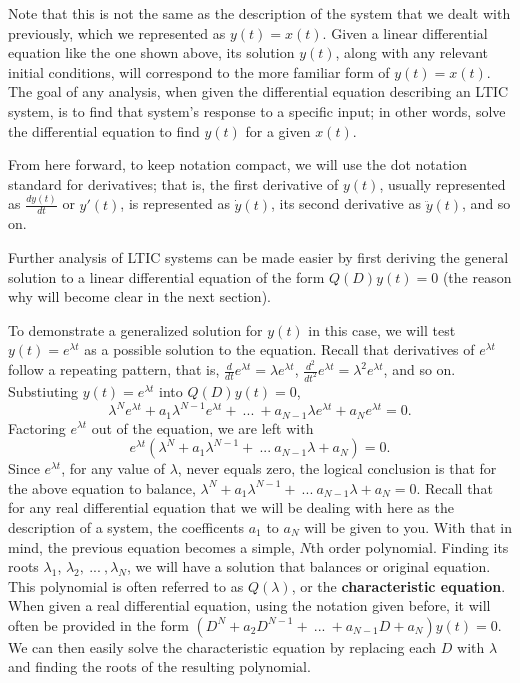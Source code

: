 \documentclass{article}
\begin{document}
Note that this is not the same as the description of the system that we dealt with previously, which we represented as \(y(t) = x(t)\). Given a linear differential equation like the one shown above, its solution \(y(t)\), along with any relevant initial conditions, will correspond to the more familiar form of \(y(t) = x(t).\) The goal of any analysis, when given the differential equation describing an LTIC system, is to find that system's response to a specific input; in other words, solve the differential equation to find \(y(t)\) for a given \(x(t)\).

From here forward, to keep notation compact, we will use the dot notation standard for derivatives; that is, the first derivative of \(y(t)\), usually represented as \(\frac{dy(t)}{dt}\) or \(y'(t)\), is represented as \(\dot{y}(t)\), its second derivative as \(\ddot{y}(t)\), and so on.

Further analysis of LTIC systems can be made easier by first deriving the general solution to a linear differential equation of the form \(Q(D)y(t) = 0\) (the reason why will become clear in the next section). 

To demonstrate a generalized solution for \(y(t)\) in this case, we will test \(y(t) = e^{\lambda t}\) as a possible solution to the equation. Recall that derivatives of \(e^{\lambda t}\) follow a repeating pattern, that is, \(\frac{d}{dt}e^{\lambda t} = \lambda e^{\lambda t}\), \(\frac{d^2}{dt^2}e^{\lambda t} = \lambda^2 e^{\lambda t}\), and so on. Substiuting \(y(t) = e^{\lambda t}\) into \(Q(D)y(t) = 0\),
  \[
		\lambda^N e^{\lambda t} + a_1 \lambda ^{N-1} e^{\lambda t} + \ ... \  + a_{N-1} \lambda e^{\lambda t} + a_N e^{\lambda t} = 0.
  \]
	Factoring \(e^{\lambda t}\) out of the equation, we are left with \[
		e^{\lambda t}(\lambda ^N + a_1 \lambda^{N-1} + \ ... \ a_{N-1}\lambda + a_N) = 0.
	\]
	Since \(e^{\lambda t}\), for any value of \(\lambda\), never equals zero, the logical conclusion is that for the above equation to balance, \(\lambda^N + a_1\lambda^{N-1} + \ ... \ a_{N-1}\lambda + a_N = 0\). Recall that for any real differential equation that we will be dealing with here as the description of a system, the coefficents \(a_1\) to \(a_N\) will be given to you. With that in mind, the previous equation becomes a simple, \(N\)th order polynomial. Finding its roots \(\lambda_1\), \(\lambda_2, \ ... \ , \lambda_N\), we will have a solution that balances or original equation. This polynomial is often referred to as \(Q(\lambda)\), or the \textbf{characteristic equation}. When given a real differential equation, using the notation given before, it will often be provided in the form \((D^N + a_2D^{N-1} + \ ... \ + a_{N-1}D + a_N)y(t) = 0\). We can then easily solve the characteristic equation by replacing each \(D\) with \(\lambda\) and finding the roots of the resulting polynomial.
\end{document}
